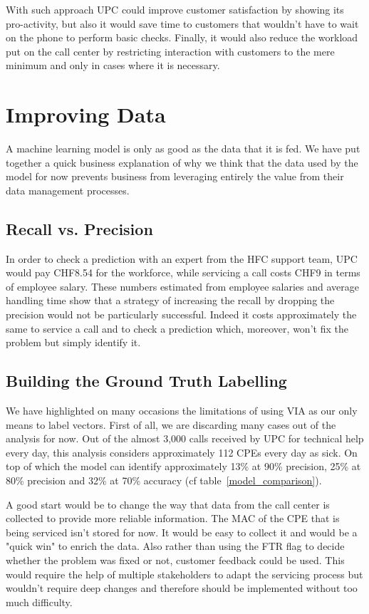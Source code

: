With such approach UPC could improve customer satisfaction by showing its pro-activity, but also it would save time to customers that wouldn't have to wait on the phone to perform basic checks. Finally, it would also reduce the workload put on the call center by restricting interaction with customers to the mere minimum and only in cases where it is necessary. 

\section{Improving Data}
\label{sec:improving}
A machine learning model is only as good as the data that it is fed. We have put together a quick business explanation of why we think that the data used by the model for now prevents business from leveraging entirely the value from their data management processes.

\subsection{Recall vs. Precision}
In order to check a prediction with an expert from the HFC support team, UPC would pay CHF8.54 for the workforce, while servicing a call costs CHF9 in terms of employee salary. These numbers estimated from employee salaries and average handling time show that a strategy of increasing the recall by dropping the precision would not be particularly successful. Indeed it costs approximately the same to service a call and to check a prediction which, moreover, won't fix the problem but simply identify it. 

\subsection{Building the Ground Truth Labelling}
We have highlighted on many occasions the limitations of using VIA as our only means to label vectors. First of all, we are discarding many cases out of the analysis for now. Out of the almost 3,000 calls received by UPC for technical help every day, this analysis considers approximately 112 CPEs every day as sick. On top of which the model can identify approximately 13\% at 90\% precision, 25\% at 80\% precision and 32\% at 70\% accuracy (cf table~\ref{model_comparison}).

A good start would be to change the way that data from the call center is collected to provide more reliable information. The MAC of the CPE that is being serviced isn't stored for now. It would be easy to collect it and would be a "quick win" to enrich the data. Also rather than using the FTR flag to decide whether the problem was fixed or not, customer feedback could be used. This would require the help of multiple stakeholders to adapt the servicing process but wouldn't require deep changes and therefore should be implemented without too much difficulty.

